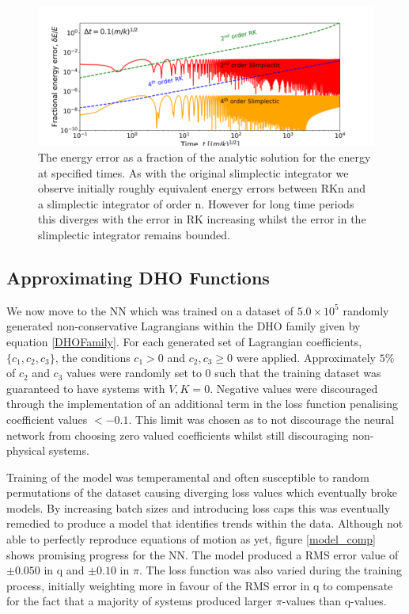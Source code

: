 \documentclass[10pt]{iopart}
\begin{document}
\begin{figure}
	\label{EnergyPlot}
	\includegraphics[width=\columnwidth]{EnergyPlot.png}
	\caption{The energy error as a fraction of the analytic solution for the energy at specified times. As with the original slimplectic integrator we observe initially roughly equivalent energy errors between RKn and a slimplectic integrator of order n. However for long time periods this diverges with the error in RK increasing whilst the error in the slimplectic integrator remains bounded.}
\end{figure}

\subsection{Approximating DHO Functions}
\label{NN Results}
We now move to the NN which was trained on a dataset of $5.0\times10^5$ randomly generated non-conservative Lagrangians within the DHO family given by equation \ref{DHOFamily}. For each generated set of Lagrangian coefficients, $\{c_1,c_2,c_3\}$, the conditions $c_1 > 0$ and $c_2,c_3 \geq 0$ were applied. Approximately $5\%$ of $c_2$ and $c_3$ values were randomly set to 0 such that the training dataset was guaranteed to have systems with $V,K = 0$. Negative values were discouraged through the implementation of an additional term in the loss function penalising coefficient values $ < -0.1$. This limit was chosen as to not discourage the neural network from choosing zero valued coefficients whilst still discouraging non-physical systems. 

Training of the model was temperamental and often susceptible to random permutations of the dataset causing diverging loss values which eventually broke models. By increasing batch sizes and introducing loss caps this was eventually remedied to produce a model that identifies trends within the data. Although not able to perfectly reproduce equations of motion as yet, figure \ref{model_comp} shows promising progress for the NN. The model produced a RMS error value of $\pm0.050$ in q and $\pm0.10$ in $\pi$. The loss function was also varied during the training process, initially weighting more in favour of the RMS error in q to compensate for the fact that a majority of systems produced larger $\pi$-values than q-values. 
\end{document}
